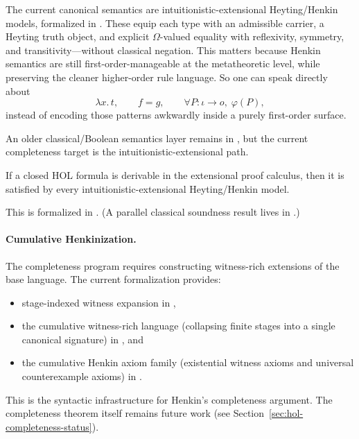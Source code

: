 \documentclass[11pt,openany]{report}
\begin{document}
The current canonical semantics are intuitionistic-extensional
Heyting/Henkin models, formalized in
.
These equip each type with an admissible carrier, a Heyting truth object,
and explicit $\Omega$-valued equality with reflexivity, symmetry, and
transitivity---without classical negation.  This matters because Henkin
semantics are still first-order-manageable at the metatheoretic level,
while preserving the cleaner higher-order rule language.
So one can speak directly about
\[
  \lambda x.\, t,\qquad f = g,\qquad \forall P : \iota \to o,\; \varphi(P),
\]
instead of encoding those patterns awkwardly inside a purely first-order
surface.

An older classical/Boolean semantics layer remains in
, but the current
completeness target is the intuitionistic-extensional path.

\begin{theorem}
If a closed HOL formula is derivable in the extensional proof calculus, then
it is satisfied by every intuitionistic-extensional Heyting/Henkin model.
\end{theorem}

This is formalized in
.
(A parallel classical soundness result lives in
.)

\paragraph{Cumulative Henkinization.}
The completeness program requires constructing witness-rich extensions of
the base language.  The current formalization provides:
\begin{itemize}
\item stage-indexed witness expansion in
  ,
\item the cumulative witness-rich language (collapsing finite stages into
  a single canonical signature) in
  , and
\item the cumulative Henkin axiom family (existential witness axioms and
  universal counterexample axioms) in
  .
\end{itemize}
This is the syntactic infrastructure for Henkin's completeness argument.
The completeness theorem itself remains future work (see
Section~\ref{sec:hol-completeness-status}).
\end{document}
